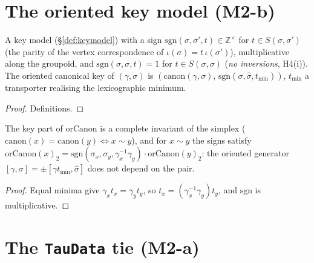 \section{The oriented key model (M2-b)}

\begin{definition}\label{def:orkeymodel}
  \leanok
  A key model (\S\ref{def:keymodel}) with a sign $\mathrm{sgn}(\sigma,\sigma',t)\in\mathbb Z^\times$ for $t\in S(\sigma,\sigma')$
  (the parity of the vertex correspondence of $\iota(\sigma)=t\,\iota(\sigma')$), multiplicative along the groupoid, and
  $\mathrm{sgn}(\sigma,\sigma,t)=1$ for $t\in S(\sigma,\sigma)$ (\emph{no inversions}, H4(i)). The oriented canonical key of
  $(\gamma,\sigma)$ is $(\mathrm{canon}(\gamma,\sigma),\,\mathrm{sgn}(\sigma,\hat\sigma,t_{\min}))$, $t_{\min}$ a transporter
  realising the lexicographic minimum.
\end{definition}
\begin{proof}
  \leanok
  Definitions.
\end{proof}

\begin{theorem}\label{thm:orkeymodel}
  \leanok
  The key part of $\mathrm{orCanon}$ is a complete invariant of the simplex ($\mathrm{canon}(x)=\mathrm{canon}(y)\iff x\sim y$),
  and for $x\sim y$ the signs satisfy $\mathrm{orCanon}(x)_2=\mathrm{sgn}(\sigma_x,\sigma_y,\gamma_x^{-1}\gamma_y)\cdot
  \mathrm{orCanon}(y)_2$: the oriented generator $[\gamma,\sigma]=\pm[\gamma t_{\min},\hat\sigma]$ does not depend on the pair.
\end{theorem}
\begin{proof}
  \leanok
  Equal minima give $\gamma_x t_x=\gamma_y t_y$, so $t_x=(\gamma_x^{-1}\gamma_y)t_y$, and $\mathrm{sgn}$ is multiplicative.
\end{proof}

\section{The \texttt{TauData} tie (M2-a)}

